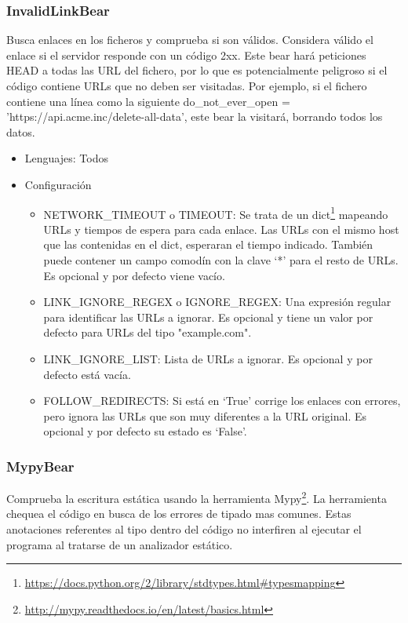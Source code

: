 \documentclass[a4paper, 12pt]{book}
\begin{document}
\subsubsection{InvalidLinkBear}
\label{sec:seccion1.2.3}
Busca enlaces en los ficheros y comprueba si son válidos. Considera válido el enlace si el servidor responde con un código 2xx. Este bear hará peticiones HEAD a todas las URL del fichero, por lo que es potencialmente peligroso si el código contiene URLs que no deben ser visitadas. Por ejemplo, si el fichero contiene una línea como la siguiente do\_not\_ever\_open = 'https://api.acme.inc/delete-all-data', este bear la visitará, borrando todos los datos.

\begin{itemize}
  \item Lenguajes: Todos
  \item Configuración
    \begin{itemize}
          \item NETWORK\_TIMEOUT o TIMEOUT: Se trata de un dict\footnote{\url{https://docs.python.org/2/library/stdtypes.html#typesmapping}} mapeando URLs y tiempos de espera para cada enlace. Las URLs con el mismo host que las contenidas en el dict, esperaran el tiempo indicado. También puede contener un campo comodín con la clave ‘*’ para el resto de URLs. Es opcional y por defecto viene vacío.
          \item LINK\_IGNORE\_REGEX o IGNORE\_REGEX: Una expresión regular para identificar las URLs a ignorar. Es opcional y tiene un valor por defecto para URLs del tipo "example.com".
          \item LINK\_IGNORE\_LIST: Lista de URLs a ignorar. Es opcional y por defecto está vacía.
          \item FOLLOW\_REDIRECTS: Si está en ‘True’ corrige los enlaces con errores, pero ignora las URLs que son muy diferentes a la URL original.  Es opcional y por defecto su estado es ‘False’.
    \end{itemize}
\end{itemize}

\subsubsection{MypyBear}
\label{sec:seccion1.2.4}
Comprueba la escritura estática usando la herramienta Mypy\footnote{\url{http://mypy.readthedocs.io/en/latest/basics.html}}. La herramienta chequea el código en busca de los errores de tipado mas comunes. Estas anotaciones referentes al tipo dentro del código no interfiren al ejecutar el programa al tratarse de un analizador estático.
\end{document}
